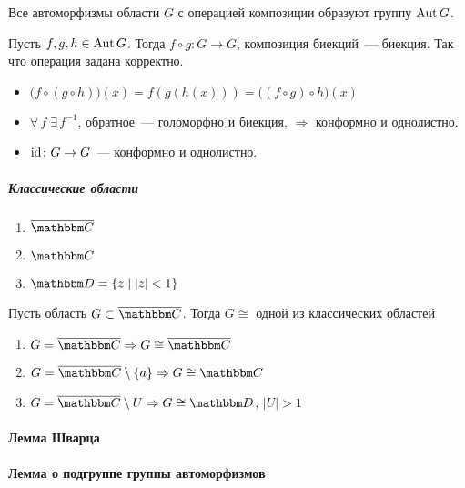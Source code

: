 \documentclass[12pt,timbord]{../../../notes}
\begin{document}
\begin{prop}\label{prop:tfcv::riemanaut::autgroup}
  Все автоморфизмы области $G$ с операцией композиции образуют группу $\operatorname{Aut} G$.
\end{prop}
\begin{itlproof}
  Пусть $f, g, h\in \operatorname{Aut} G$. Тогда $f \circ g \colon G \to G$, композиция биекций~--- биекция. Так
  что операция задана корректно.
  \begin{itemize}
    \item $\bigl(f \circ (g\circ h)\bigr)(x) = f(g(h(x))) = \bigl((f \circ g)\circ h\bigr)(x)$
    \item $\forall\, f\; \exists\,f^{-1}$, обратное~--- голоморфно и биекция, $ \Rightarrow $
      конформно и однолистно.
    \item $\operatorname{id}\colon G\to G$~--- конформно и однолистно. 
  \end{itemize}
\end{itlproof}

\subparagraph{Классические области}
\begin{enumerate}
  \item $\overline{\C}$
  \item ${\C}$
  \item $\D = \{z\mid |z| < 1\}$
\end{enumerate}

\begin{thrm}[Римана]\label{thrm:tfcv::riemanaut::rieman}
  Пусть область $G \subset \exC $. Тогда $G\cong$ одной из классических областей
  \begin{enumerate}
    \item $G = \exC \Rightarrow G \cong \exC$
    \item $G = \exC \setminus \{a\} \Rightarrow G \cong \C$
    \item $G = \exC \setminus U \Rightarrow G \cong \D$, $|U| > 1$
  \end{enumerate}
\end{thrm}

\paragraph{Лемма Шварца}
\label{par:tfcv::shwartz}


\paragraph{Лемма о подгруппе группы автоморфизмов}
\label{par:tfcv::subautgr}
\end{document}

